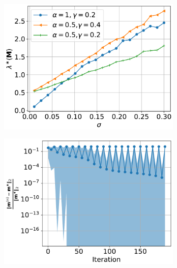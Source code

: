 \begin{figure}[!ht]
  
  \begin{subfigure}{0.5\textwidth}
    \centering
    \includegraphics[width=1\columnwidth]{figures/converge/contraction_vs_variance_crop.pdf}
    \caption{}
    \label{fig:largest_singular}
  \end{subfigure}
  \begin{subfigure}{0.5\textwidth}
    \includegraphics[width=1\columnwidth]
    {figures/converge/converge_erp0_4_alpha_1_stn_0_5_vs_filter_false_crop.pdf}
    \caption{}
    \label{fig:log-error-iter-diverse}
  \end{subfigure}

\end{figure}
